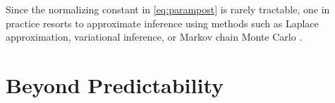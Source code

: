 \documentclass[journal]{IEEEtran}
\theoremstyle{definition}
\theoremstyle{remark}
\newcommand{\E}{\mathbb{E}}
\newcommand{\Dset}{\mathcal{D}}
\newcommand{\Pset}{\mathcal{P}}
\begin{document}
Since the normalizing constant in \eqref{eq:parampost} is
rarely tractable, one in practice resorts to approximate inference using methods such as Laplace
approximation, variational inference, or Markov chain Monte Carlo \cite{simeone2022ml}.

{

\section{Beyond Predictability}




}
\end{document}
